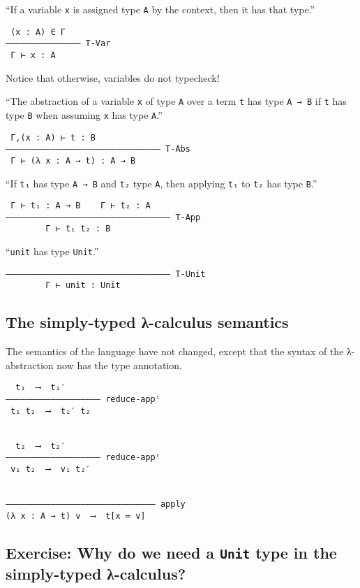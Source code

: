 \documentclass[11pt]{article}
\theoremstyle{definition}
\begin{document}
“If a variable \texttt{x} is assigned type \texttt{A} by the context,
then it has that type.”
\begin{verbatim}
 (x : A) ∈ Γ
––––––––––––––– T-Var
 Γ ⊢ x : A
\end{verbatim}
Notice that otherwise, variables do not typecheck!

“The abstraction of a variable \texttt{x} of type \texttt{A} over a term \texttt{t} has
type \texttt{A → B} if \texttt{t} has type \texttt{B} when assuming \texttt{x} has type \texttt{A}.” 
\begin{verbatim}
 Γ,(x : A) ⊢ t : B
––––––––––––––––––––––––––––––– T-Abs
 Γ ⊢ (λ x : A → t) : A → B
\end{verbatim}

“If \texttt{t₁} has type \texttt{A → B} and \texttt{t₂} type \texttt{A}, then applying \texttt{t₁} to \texttt{t₂} has type \texttt{B}.”
\begin{verbatim}
 Γ ⊢ t₁ : A → B    Γ ⊢ t₂ : A
––––––––––––––––––––––––––––––––– T-App
        Γ ⊢ t₁ t₂ : B
\end{verbatim}

“\texttt{unit} has type \texttt{Unit}.” 
\begin{verbatim}
––––––––––––––––––––––––––––––––– T-Unit
        Γ ⊢ unit : Unit
\end{verbatim}

\subsection{The simply-typed λ-calculus semantics}
\label{sec:orgbca1872}

The semantics of the language have not changed,
except that the syntax of the λ-abstraction now
has the type annotation.
\begin{verbatim}
  t₁  ⟶  t₁′
––––––––––––––––––– reduce-appˡ
 t₁ t₂  ⟶  t₁′ t₂

 
  t₂  ⟶  t₂′
––––––––––––––––––– reduce-appʳ
 v₁ t₂  ⟶  v₁ t₂′


–––––––––––––––––––––––––––––– apply
(λ x : A → t) v  ⟶  t[x ≔ v]
\end{verbatim}

\subsection{Exercise: Why do we need a \texttt{Unit} type in the simply-typed λ-calculus?}
\label{sec:org5e362e0}
\end{document}
